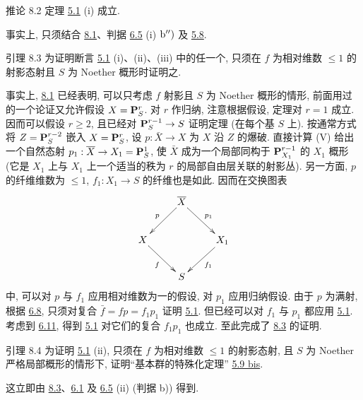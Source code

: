 \begin{enonce*}{推论 8.2}
定理 {\rm \hyperref[XII.thm5.1]{5.1} (i)} 成立.
\end{enonce*}

事实上, 只须结合 \hyperref[XII.lem8.1]{8.1}、判据 \hyperref[XII.prop6.5]{6.5} (i) ${\rm b'')}$ 及 \hyperref[XII.lem5.8]{5.8}.

\begin{enonce*}{引理 8.3}
为\pageoriginale 证明断言 {\rm \hyperref[XII.thm5.1]{5.1} (i)、(ii)、(iii)} 中的任一个, 只须在 $f$ 为相对维数 $\leq 1$ 的射影态射且 $S$ 为 Noether 概形时证明之.
\end{enonce*}

事实上, \hyperref[XII.lem8.1]{8.1} 已经表明, 可以只考虑 $f$ 射影且 $S$ 为 Noether 概形的情形, 前面用过的一个论证又允许假设 $X=\mathbf{P}^r_S$. 对 $r$ 作归纳, 注意根据假设, 定理对 $r=1$ 成立. 因而可以假设 $r\geq2$, 且已经对 $\mathbf{P}^{r-1}_S\rightarrow S$ 证明定理 (在每个基 $S$ 上). 按通常方式将 $Z=\mathbf{P}^{r-2}_S$ 嵌入 $X=\mathbf{P}^r_S$, 设 $p:\bar{X}\rightarrow X$ 为 $X$ 沿 $Z$ 的爆破. 直接计算 (\cf \EGA V) 给出一个自然态射 $p_1:\overline{X}\rightarrow X_1=\mathbf{P}^1_S$, 使 $\bar{X}$ 成为一个局部同构于 $\mathbf{P}^{r-1}_{X_1}$ 的 $X_1$ 概形 (它是 $X_1$ 上与 $X_1$ 上一个适当的秩为 $r$ 的局部自由层关联的射影丛). 另一方面, $p$ 的纤维维数为 $\leq1$, $f_1:X_1\rightarrow S$ 的纤维也是如此. 因而在交换图表
$$
\xymatrix{
   & \bar{X} \ar[ld]_{p} \ar[rd]^{p_1} &          \\
 X \ar[rd]_{f}&           & X_1\ar[ld]^{f_1}\\
   &    S      &
}$$
中, 可以对 $p$ 与 $f_1$ 应用相对维数为一的假设, 对 $p_1$ 应用归纳假设. 由于 $p$ 为满射, 根据 \hyperref[XII.prop6.8]{6.8}, 只须对复合 $\bar{f}=fp=f_1p_1$ 证明 \hyperref[XII.thm5.1]{5.1}. 但已经可以对 $f_1$ 与 $p_1$ 都应用 \hyperref[XII.thm5.1]{5.1}. 考虑到 \hyperref[XII.prop6.11]{6.11}, 得到 \hyperref[XII.thm5.1]{5.1} 对它们的复合 $f_1p_1$ 也成立. 至此完成了 \hyperref[XII.lem8.3]{8.3} 的证明.

\begin{enonce*}{引理 8.4}
为\pageoriginale 证明 {\rm \hyperref[XII.thm5.1]{5.1} (ii)}, 只须在 $f$ 为相对维数 $\leq1$ 的射影态射, 且 $S$ 为 Noether 严格局部概形的情形下, 证明“基本群的特殊化定理” {\rm \hyperref[XII.thmbis5.9]{5.9 bis}}.
\end{enonce*}

这立即由 \hyperref[XII.lem8.3]{8.3}、\hyperref[XII.lem6.1]{6.1} 及 \hyperref[XII.prop6.5]{6.5} (ii) (判据 b)) 得到.

